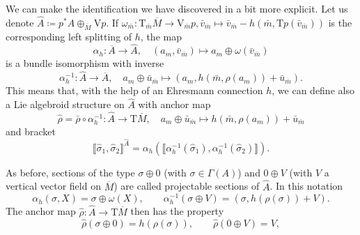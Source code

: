 \documentclass[11pt]{article}
\theoremstyle{plain}
\theoremstyle{definition}
\begin{document}
We can make the identification we have discovered in  a bit more explicit. Let us denote $\widehat A\coloneqq p^{\ast}A\oplus_{\overline{M}} \mathrm{V}p$. If $\omega_{\bar m}\colon \mathrm{T}_{\bar m}{\overline M} \to \mathrm{V}_{\bar m}p, {\bar v}_{\bar m} \mapsto {\bar v}_{\bar m} - h(\bar m, \mathrm{T}p ({\bar v}_{\bar m}))$ is the corresponding left splitting of  $ h$, the map
\begin{equation*}
    \alpha_h\colon  \overline A \longrightarrow \widehat A,\quad (a_m, {\bar v}_{\bar m})\longmapsto  a_m\oplus \omega({\bar v}_{\bar m})  
\end{equation*}
is a bundle isomorphism with inverse
\begin{equation*}
    {\alpha}_h^{-1}\colon \widehat A \longrightarrow \overline A,\quad   a_m \oplus {\bar u}_{\bar m} \longmapsto (a_m,  h(\bar m, \rho(a_m)) + {\bar u}_{\bar m}).
\end{equation*}
This means that, with the help of an Ehresmann connection $ h$, we can define also a Lie algebroid structure on $\widehat A$ with anchor map
\begin{equation*}
    \hat\rho = \bar\rho \circ \alpha_h^{-1}\colon \widehat A \longrightarrow \mathrm{T}\overline M,\quad a_m \oplus {\bar u}_{\bar m} \longmapsto   h(\bar m, \rho(a_m)) + {\bar u}_{\bar m}
\end{equation*}
and bracket
\begin{equation*}
    \llbracket{\hat\sigma}_1, {\hat\sigma}_2\rrbracket^{\widehat A} = \alpha_h \left( \llbracket  \alpha_h^{-1}({\hat\sigma}_1), \alpha_h^{-1}({\hat\sigma}_2)\rrbracket \right).
\end{equation*}



As before, sections of the type $\sigma\oplus 0$ (with $\sigma\in\Gamma(A)$) and $0\oplus V$ (with $V$ a vertical vector field on $\overline M$) are called projectable sections of $\widehat A$. 
In this notation
\begin{equation*}
    \alpha_h(\sigma,X)=\sigma \oplus \omega(X),\qquad \alpha_h^{-1}(\sigma \oplus V) = (\sigma,  h(\rho(\sigma))+V).
\end{equation*}
The anchor map $\hat\rho\colon \widehat A \to \mathrm{T}\overline M$  then has the property 
\begin{equation*}
    \hat\rho(\sigma\oplus 0) =  h(\rho(\sigma)), \qquad \hat\rho(0\oplus V) = V,
\end{equation*}
\end{document}

